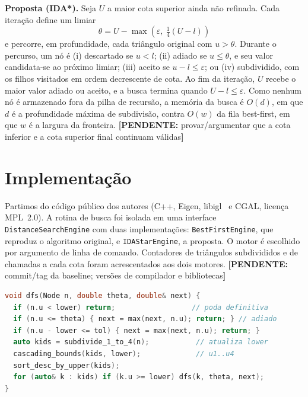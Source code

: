 \documentclass[9pt,a4paper,twocolumn]{extarticle}
\newif\ifmostrarorientacoes
\newcommand{\orientacao}[1]{%
  \ifmostrarorientacoes
    \par\smallskip
    \noindent\fcolorbox{black!35}{black!4}{%
      \parbox{0.94\columnwidth}{\fontsize{7.4}{8.2}\selectfont\textbf{Orientação aos autores:} #1}%
    }%
    \par\smallskip
  \fi
}
\newcommand{\pendente}[1]{{\color{red!70!black}\textbf{[PENDENTE:} #1\textbf{]}}}
\begin{document}
\textbf{Proposta (IDA*).} Seja $U$ a maior cota superior ainda não refinada. Cada
iteração define um limiar
\begin{equation}
  \theta = U - \max\!\left(\varepsilon,\ \tfrac{1}{4}(U - l)\right)
  \label{eq:limiar}
\end{equation}
e percorre, em profundidade, cada triângulo original com $u > \theta$. Durante o
percurso, um nó é (i) descartado se $u < l$; (ii) adiado se $u \le \theta$, e seu
valor candidata-se ao próximo limiar; (iii) aceito se $u - l \le \varepsilon$; ou
(iv) subdividido, com os filhos visitados em ordem decrescente de cota. Ao fim da
iteração, $U$ recebe o maior valor adiado ou aceito, e a busca termina quando
$U - l \le \varepsilon$. Como nenhum nó é armazenado fora da pilha de recursão, a
memória da busca é $O(d)$, em que $d$ é a profundidade máxima de subdivisão, contra
$O(w)$ da fila best-first, em que $w$ é a largura da fronteira.
\pendente{provar/argumentar que a cota inferior e a cota superior final continuam válidas}

\section{Implementação}
\orientacao{Informe apenas os detalhes necessários para compreender e reproduzir o
trabalho: linguagem, bibliotecas, versão da baseline, alterações relevantes, hardware
e parâmetros. O manual completo de instalação deve ficar no README do GitHub.}

Partimos do código público dos autores (C++, Eigen, libigl~\parencite{libigl} e CGAL,
licença MPL~2.0). A rotina de busca foi isolada em uma interface
\texttt{DistanceSearchEngine} com duas implementações: \texttt{BestFirstEngine}, que
reproduz o algoritmo original, e \texttt{IDAStarEngine}, a proposta. O motor é
escolhido por argumento de linha de comando. Contadores de triângulos subdivididos e
de chamadas a cada cota foram acrescentados aos dois motores.
\pendente{commit/tag da baseline; versões de compilador e bibliotecas}

\begin{lstlisting}[language=C++,caption={Núcleo recursivo do motor IDA* (simplificado).},label={lst:dfs}]
void dfs(Node n, double theta, double& next) {
  if (n.u < lower) return;                  // poda definitiva
  if (n.u <= theta) { next = max(next, n.u); return; } // adiado
  if (n.u - lower <= tol) { next = max(next, n.u); return; }
  auto kids = subdivide_1_to_4(n);           // atualiza lower
  cascading_bounds(kids, lower);             // u1..u4
  sort_desc_by_upper(kids);
  for (auto& k : kids) if (k.u >= lower) dfs(k, theta, next);
}
\end{lstlisting}
\end{document}
